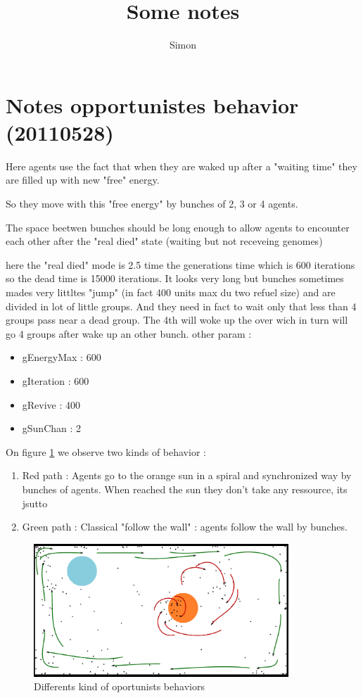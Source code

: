 \documentclass[a4paper,10pt]{article}
\title{Some notes}
\author{Simon}
\begin{document}
\maketitle

\section{Notes opportunistes behavior (20110528)}

Here agents use the fact that when they are waked up after a "waiting time" they are filled up with new "free" energy.

So they move with this "free energy" by bunches of 2, 3 or 4 agents.

The space beetwen bunches should be long enough to allow agents to encounter each other after the "real died" state (waiting but not receveing genomes)

here the "real died" mode is 2.5 time the generations time which is 600 iterations so the dead time is 15000 iterations. It looks very long but bunches sometimes mades very littltes "jump" (in fact 400 units max du two refuel size) and are divided in lot of little groups. And they need in fact to wait only that less than 4 groups  pass near a dead group. The 4th will woke up the over wich in turn will go 4 groups after wake up an other bunch. 
other param :
\begin{itemize}
 \item gEnergyMax : 600
 \item gIteration : 600
 \item gRevive : 400
 \item gSunChan : 2
\end{itemize}


On figure \ref{fig:opportunistsA} we observe two kinds of behavior :
\begin{enumerate}
 \item Red path : Agents go to the orange sun in a spiral and synchronized way by bunches of agents. When reached the sun they don't take any ressource, its jsutto
 \item Green path : Classical "follow the wall" : agents follow the wall by bunches.
\end{enumerate}

\begin{figure}
\begin{center}
\label{fig:opportunistsA}
\caption{Differents kind of oportunists behaviors}
\includegraphics[height=5cm]{201129_agentOportunistes_passlifetorchbis}
\end{center}
\end{figure}
\end{document}
